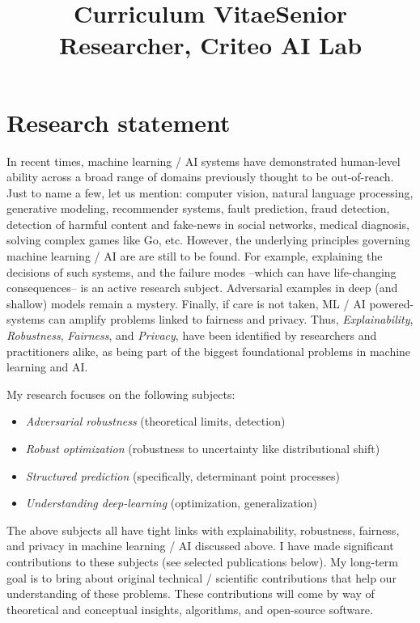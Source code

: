 \documentclass[11pt,a4paper,roman,unicode]{moderncv}
\title{Curriculum Vitae}
\title{Senior Researcher, Criteo AI Lab}
\begin{document}
\maketitle


\section{Research statement}
{In recent times, machine learning / AI systems have demonstrated human-level ability across a broad range of
  domains previously thought to be out-of-reach. Just to name a few, let us mention: computer vision, natural
  language processing, generative modeling, recommender systems, fault
  prediction, fraud detection, detection of harmful content and fake-news in social networks, medical diagnosis, solving complex games like Go, etc. However, the underlying principles governing machine learning / AI are are still to be found. For example, explaining the decisions of such systems, and the failure modes --which can have life-changing consequences-- is an active research subject. Adversarial examples in deep (and shallow) models remain a mystery. Finally, if care is not taken, ML / AI powered-systems can amplify
  problems linked to fairness and privacy. Thus,
  \emph{Explainability}, \emph{Robustness}, \emph{Fairness}, and
  \emph{Privacy}, have been identified by researchers and practitioners alike,
  as being part of the biggest foundational problems in machine learning and  AI.
}

{My research focuses on the following subjects:
  \begin{itemize}
  \item \emph{Adversarial robustness} (theoretical limits, detection)
  \item \emph{Robust optimization} (robustness to uncertainty like
    distributional shift)
  \item \emph{Structured prediction} (specifically, determinant point processes)
  \item \emph{Understanding deep-learning} (optimization, generalization)
  \end{itemize}
  The above subjects all have tight links with explainability, robustness,
  fairness, and privacy in machine learning / AI discussed above. I have made significant contributions to these subjects (see selected publications below).
  My long-term goal is to bring about original technical / scientific contributions
  that help our understanding of these problems. These contributions will come by way of theoretical and conceptual insights, algorithms, and open-source software.
}
\end{document}
